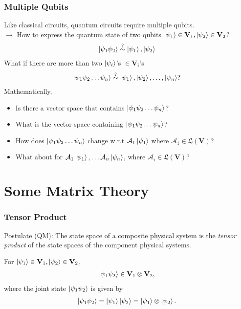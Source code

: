 \documentclass{beamer}
\theoremstyle{definition}
\newcommand{\V}{\mathbf{V}}
\newcommand{\A}{\mathcal{A}}
\begin{document}
\begin{frame}
\frametitle{Multiple Qubits}
Like classical circuits, quantum circuits require multiple qubits.\\
$\rightarrow$ How to express the quantum state of two qubits $\ket{\psi_1}\in \V_1, \ket{\psi_2}\in \V_2$?
\begin{align*}
\left\vert{\psi_1\psi_2}\right\rangle \stackrel{?}{\sim} \left\vert{\psi_1}\right\rangle, \left\vert{\psi_2}\right\rangle
\end{align*}
What if there are more than two $\left\vert{\psi_i}\right\rangle$'s $\in \V_i$'s
\begin{align*}
\left\vert{\psi_1\psi_2\dots\psi_n}\right\rangle \stackrel{?}{\sim} \left\vert{\psi_1}\right\rangle,\left\vert{\psi_2}\right\rangle,\dots,\left\vert{\psi_n}\right\rangle?
\end{align*}
Mathematically,
\begin{itemize}
	\item Is there a vector space that contains $\left\vert{\psi_1\psi_2\dots\psi_n}\right\rangle$?
	\item What is the vector space containing $\left\vert{\psi_1\psi_2\dots\psi_n}\right\rangle$?
	\item How does $\left\vert{\psi_1\psi_2\dots\psi_n}\right\rangle$ change w.r.t $\A_1\ket{\psi_1}$ where $\A_1 \in \mathfrak{L}(\V)$?
	\item What about for $\A_1\ket{\psi_1},\dots\A_n\ket{\psi_n}$, where $\A_i \in \mathfrak{L}(\V)$?
\end{itemize}
\end{frame}


















\section{Some Matrix Theory}


\begin{frame}
\frametitle{Tensor Product}
\begin{block}{Postulate (QM): \tiny{\cite{nielsen2002quantum}}}
	The state space of a composite physical system is the \textit{tensor product} of the state spaces of the component physical systems.
\end{block}
For $\ket{\psi_1}\in \V_1, \ket{\psi_2} \in \V_2$, 
\begin{align*}
\ket{\psi_1\psi_2} \in \V_1\otimes   \V_2,
\end{align*}
where the joint state $\left\vert{\psi_1\psi_2}\right\rangle$ is given by
\begin{align*}
\left\vert{\psi_1\psi_2}\right\rangle = \left\vert{\psi_1}\right\rangle\left\vert{\psi_2}\right\rangle = \left\vert{\psi_1}\right\rangle\otimes   \left\vert{\psi_2}\right\rangle.
\end{align*}




\end{frame}
\end{document}
